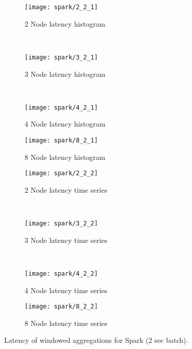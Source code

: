 \begin{figure*}
    \centering
    \begin{subfigure}[b]{0.49\textwidth}
        \texttt{[image: spark/2\_2\_1]}
        \caption{2 Node latency histogram}
    \end{subfigure}
    ~ %
    \begin{subfigure}[b]{0.49\textwidth}
        \texttt{[image: spark/3\_2\_1]}
        \caption{3 Node latency histogram}
    \end{subfigure}
    ~ %
    \begin{subfigure}[b]{0.49\textwidth}
        \texttt{[image: spark/4\_2\_1]}
        \caption{4 Node latency histogram}
    \end{subfigure}
        \begin{subfigure}[b]{0.49\textwidth}
        \texttt{[image: spark/8\_2\_1]}
        \caption{8 Node latency histogram}
    \end{subfigure}


    \begin{subfigure}[b]{0.49\textwidth}
        \texttt{[image: spark/2\_2\_2]}
        \caption{2 Node latency time series}
    \end{subfigure}
    ~ %
    \begin{subfigure}[b]{0.49\textwidth}
        \texttt{[image: spark/3\_2\_2]}
        \caption{3 Node latency time series}
    \end{subfigure}
    ~ %
    \begin{subfigure}[b]{0.49\textwidth}
        \texttt{[image: spark/4\_2\_2]}
        \caption{4 Node latency time series}
    \end{subfigure}
        \begin{subfigure}[b]{0.49\textwidth}
        \texttt{[image: spark/8\_2\_2]}
        \caption{8 Node latency time series}
    \end{subfigure}

    \label{fig_flink_agg_1}
        \caption{Latency of windowed aggregations for Spark (2 sec batch).}
\end{figure*}





